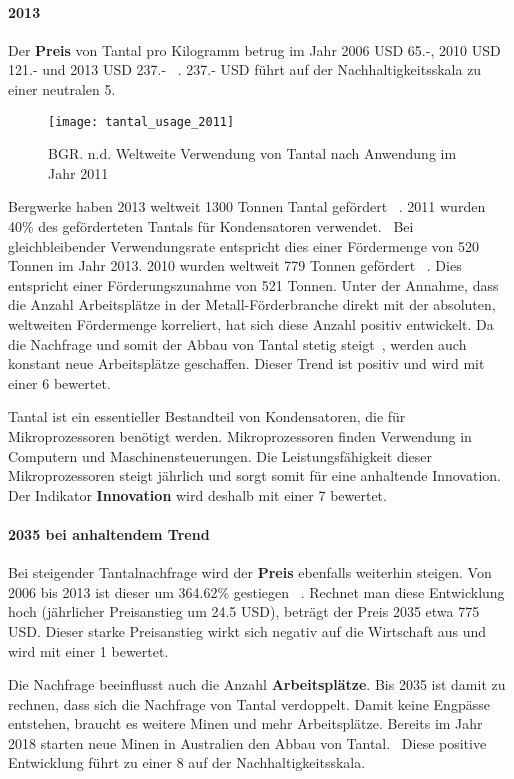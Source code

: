 \paragraph{2013}
Der \textbf{Preis} von Tantal pro Kilogramm betrug im Jahr 2006 USD 65.-, 2010 USD 121.- und 2013 USD 237.- ~\cite{tantal_price2}. 237.- USD führt auf der Nachhaltigkeitsskala zu einer neutralen 5.

\begin{figure}[h]
\centering
\texttt{[image: tantal\_usage\_2011]}
\caption{BGR. n.d. Weltweite Verwendung von Tantal nach Anwendung im Jahr 2011 ~\cite{tantal_usage}}
\label{}
\end{figure}

Bergwerke haben 2013 weltweit 1300 Tonnen Tantal gefördert ~\cite{tantal_price2}. 2011 wurden 40\% des geförderteten Tantals für Kondensatoren verwendet.~\cite{tantal_usage} Bei gleichbleibender Verwendungsrate entspricht dies einer Fördermenge von 520 Tonnen im Jahr 2013. 2010 wurden weltweit 779 Tonnen gefördert ~\cite{tantal_price2}. Dies entspricht einer Förderungszunahme von 521 Tonnen. Unter der Annahme, dass die Anzahl Arbeitsplätze in der Metall-Förderbranche direkt mit der absoluten, weltweiten Fördermenge korreliert, hat sich diese Anzahl positiv entwickelt. 
Da die Nachfrage und somit der Abbau von Tantal stetig steigt~\cite{tantal_price2}, werden auch konstant neue Arbeitsplätze geschaffen. Dieser Trend ist positiv und wird mit einer 6 bewertet.

Tantal ist ein essentieller Bestandteil von Kondensatoren, die für Mikroprozessoren benötigt werden. Mikroprozessoren finden Verwendung in Computern und Maschinensteuerungen. Die Leistungsfähigkeit dieser Mikroprozessoren steigt jährlich und sorgt somit für eine anhaltende Innovation. Der Indikator \textbf{Innovation} wird deshalb mit einer 7 bewertet.

\paragraph{2035 bei anhaltendem Trend}
Bei steigender Tantalnachfrage wird der \textbf{Preis} ebenfalls weiterhin steigen. Von 2006 bis 2013 ist dieser um 364.62\% gestiegen ~\cite{tantal_price2}. Rechnet man diese Entwicklung hoch (jährlicher Preisanstieg um 24.5 USD), beträgt der Preis 2035 etwa 775 USD. Dieser starke Preisanstieg wirkt sich negativ auf die Wirtschaft aus und wird mit einer 1 bewertet.

Die Nachfrage beeinflusst auch die Anzahl \textbf{Arbeitsplätze}. Bis 2035 ist damit zu rechnen, dass sich die Nachfrage von Tantal verdoppelt. Damit keine Engpässe entstehen, braucht es weitere Minen und mehr Arbeitsplätze. Bereits im Jahr 2018 starten neue Minen in Australien den Abbau von Tantal.~\cite{new_mine_aus} Diese positive Entwicklung führt zu einer 8 auf der Nachhaltigkeitsskala.

